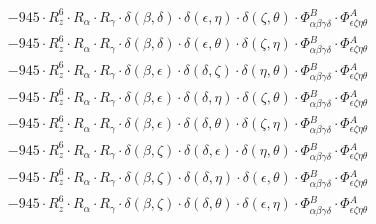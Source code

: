 \documentclass{article}
\begin{document}
\begin{equation}
\begin{array}{c}
 \\[0.2em] 		 - 945 \cdot R_{z}^{6} \cdot R_{\alpha{}} \cdot R_{\gamma{}} \cdot \delta{}\left(\beta{}, \delta{}\right) \cdot \delta{}\left(\epsilon{}, \eta{}\right) \cdot \delta{}\left(\zeta{}, \theta{}\right) \cdot \Phi{}^{B}_{\alpha{}\beta{}\gamma{}\delta{}} \cdot \Phi{}^{A}_{\epsilon{}\zeta{}\eta{}\theta{}} 
 \\[0.2em] 		 - 945 \cdot R_{z}^{6} \cdot R_{\alpha{}} \cdot R_{\gamma{}} \cdot \delta{}\left(\beta{}, \delta{}\right) \cdot \delta{}\left(\epsilon{}, \theta{}\right) \cdot \delta{}\left(\zeta{}, \eta{}\right) \cdot \Phi{}^{B}_{\alpha{}\beta{}\gamma{}\delta{}} \cdot \Phi{}^{A}_{\epsilon{}\zeta{}\eta{}\theta{}} 
 \\[0.2em] 		 - 945 \cdot R_{z}^{6} \cdot R_{\alpha{}} \cdot R_{\gamma{}} \cdot \delta{}\left(\beta{}, \epsilon{}\right) \cdot \delta{}\left(\delta{}, \zeta{}\right) \cdot \delta{}\left(\eta{}, \theta{}\right) \cdot \Phi{}^{B}_{\alpha{}\beta{}\gamma{}\delta{}} \cdot \Phi{}^{A}_{\epsilon{}\zeta{}\eta{}\theta{}} 
 \\[0.2em] 		 - 945 \cdot R_{z}^{6} \cdot R_{\alpha{}} \cdot R_{\gamma{}} \cdot \delta{}\left(\beta{}, \epsilon{}\right) \cdot \delta{}\left(\delta{}, \eta{}\right) \cdot \delta{}\left(\zeta{}, \theta{}\right) \cdot \Phi{}^{B}_{\alpha{}\beta{}\gamma{}\delta{}} \cdot \Phi{}^{A}_{\epsilon{}\zeta{}\eta{}\theta{}} 
 \\[0.2em] 		 - 945 \cdot R_{z}^{6} \cdot R_{\alpha{}} \cdot R_{\gamma{}} \cdot \delta{}\left(\beta{}, \epsilon{}\right) \cdot \delta{}\left(\delta{}, \theta{}\right) \cdot \delta{}\left(\zeta{}, \eta{}\right) \cdot \Phi{}^{B}_{\alpha{}\beta{}\gamma{}\delta{}} \cdot \Phi{}^{A}_{\epsilon{}\zeta{}\eta{}\theta{}} 
 \\[0.2em] 		 - 945 \cdot R_{z}^{6} \cdot R_{\alpha{}} \cdot R_{\gamma{}} \cdot \delta{}\left(\beta{}, \zeta{}\right) \cdot \delta{}\left(\delta{}, \epsilon{}\right) \cdot \delta{}\left(\eta{}, \theta{}\right) \cdot \Phi{}^{B}_{\alpha{}\beta{}\gamma{}\delta{}} \cdot \Phi{}^{A}_{\epsilon{}\zeta{}\eta{}\theta{}} 
 \\[0.2em] 		 - 945 \cdot R_{z}^{6} \cdot R_{\alpha{}} \cdot R_{\gamma{}} \cdot \delta{}\left(\beta{}, \zeta{}\right) \cdot \delta{}\left(\delta{}, \eta{}\right) \cdot \delta{}\left(\epsilon{}, \theta{}\right) \cdot \Phi{}^{B}_{\alpha{}\beta{}\gamma{}\delta{}} \cdot \Phi{}^{A}_{\epsilon{}\zeta{}\eta{}\theta{}} 
 \\[0.2em] 		 - 945 \cdot R_{z}^{6} \cdot R_{\alpha{}} \cdot R_{\gamma{}} \cdot \delta{}\left(\beta{}, \zeta{}\right) \cdot \delta{}\left(\delta{}, \theta{}\right) \cdot \delta{}\left(\epsilon{}, \eta{}\right) \cdot \Phi{}^{B}_{\alpha{}\beta{}\gamma{}\delta{}} \cdot \Phi{}^{A}_{\epsilon{}\zeta{}\eta{}\theta{}} 

\end{array}
\end{equation}
\end{document}
